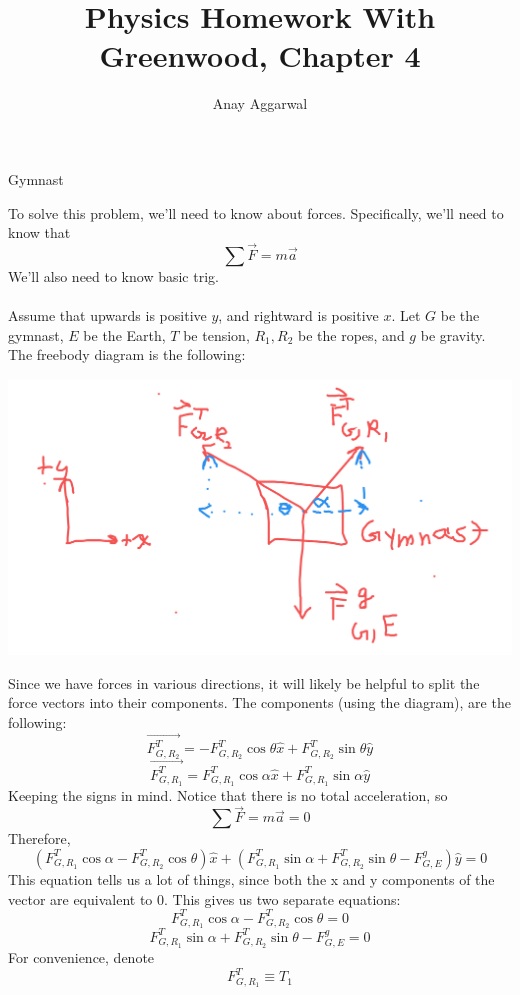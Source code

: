 \documentclass[11pt]{scrartcl}
\title{Physics Homework With Greenwood, Chapter 4}
\author{Anay Aggarwal}
\begin{document}
\maketitle
\begin{example}
  Gymnast
\end{example}
\begin{soln}
To solve this problem, we'll need to know about forces. Specifically,
we'll need to know that
$$\sum \overrightarrow{F}=m\overrightarrow{a}$$
We'll also need to know basic trig.
\\ \\
Assume that upwards is positive $y$, and rightward is positive $x$.
Let $G$ be the gymnast, $E$ be the Earth, $T$ be tension, $R_1,R_2$ be the ropes, and $g$ be gravity.
The freebody diagram is the following:
\begin{center}\includegraphics[scale=0.3]{impostor.png}\end{center}
Since we have forces in various directions, it will likely be helpful to split the force
vectors into their components. The components (using the diagram), are the following:
$$\overrightarrow{F_{G,R_2}^T}=-F_{G,R_2}^T\cos\theta \hat{x}+F_{G,R_2}^T\sin\theta \hat{y}$$
$$\overrightarrow{F_{G,R_1}^T}=F_{G,R_1}^T\cos\alpha\hat{x}+F_{G,R_1}^T\sin\alpha \hat{y}$$
Keeping the signs in mind. Notice that there is no total acceleration, so
$$\sum \overrightarrow{F}=m\overrightarrow{a}=0$$
Therefore,
$$(F_{G,R_1}^T\cos\alpha-F_{G,R_2}^T\cos\theta)\hat{x}+(F_{G,R_1}^T\sin\alpha+F_{G,R_2}^T\sin\theta-F_{G,E}^g)\hat{y}=0$$
This equation tells us a lot of things, since both the x and y components of the vector are equivalent to $0$.
This gives us two separate equations:
$$F_{G,R_1}^T\cos\alpha-F_{G,R_2}^T\cos\theta=0$$
$$F_{G,R_1}^T\sin\alpha+F_{G,R_2}^T\sin\theta-F_{G,E}^g=0$$
For convenience, denote
$$F_{G,R_1}^T\equiv T_1$$

\end{soln}
\end{document}
